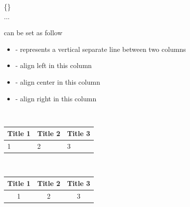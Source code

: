 \begin{frame}
	\begin{command}
		\{\}\\
		\qquad ...\\
	\end{command}
	 can be set as follow
	\begin{itemize}
		\item \structure{$|$} - represents a vertical separate line between two columns
		\item {} - align left in this column
		\item {} - align center in this column
		\item {} - align right in this column
	\end{itemize}
	\begin{example}
		\begin{minipage}{0.48\linewidth}
			\centering
			\\[0.5em]
        	\begin{tabular}{|l|l|l|}
        		\hline
        		Title 1 & Title 2 & Title 3 \\
        		\hline
        		1 & 2 &3 \\
        		\hline
        	\end{tabular}
		\end{minipage}
		\begin{minipage}{0.48\linewidth}
			\centering
			\\[0.5em]
        	\begin{tabular}{||c|cc||}
        		\hline
        		Title 1 & Title 2 & Title 3 \\
        		\hline
        		1 & 2 &3 \\
        		\hline
        	\end{tabular}
		\end{minipage}
    \end{example}	
\end{frame}

